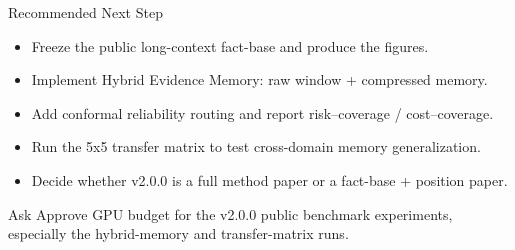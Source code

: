 \begin{frame}{Recommended Next Step}
  \small
  \begin{itemize}
    \item Freeze the public long-context fact-base and produce the figures.
    \item Implement Hybrid Evidence Memory: raw window + compressed memory.
    \item Add conformal reliability routing and report risk--coverage / cost--coverage.
    \item Run the 5x5 transfer matrix to test cross-domain memory generalization.
    \item Decide whether v2.0.0 is a full method paper or a fact-base + position paper.
  \end{itemize}
  \begin{block}{Ask}
    Approve GPU budget for the v2.0.0 public benchmark experiments, especially
    the hybrid-memory and transfer-matrix runs.
  \end{block}
\end{frame}
